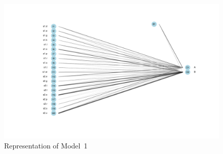 \begin{figure}%
  \includegraphics[scale=0.45]{./figures/fake/model1.pdf}
  \caption{Representation of Model~1}\label{fig:model1}
\end{figure}

